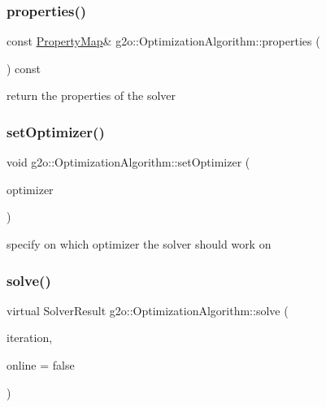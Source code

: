 \subsubsection{\texorpdfstring{properties()}{properties()}}
{\footnotesize\ttfamily const \mbox{\hyperlink{classg2o_1_1_property_map}{Property\+Map}}\& g2o\+::\+Optimization\+Algorithm\+::properties (\begin{DoxyParamCaption}{ }\end{DoxyParamCaption}) const\hspace{0.3cm}{\ttfamily [inline]}}



return the properties of the solver 

\mbox{\label{classg2o_1_1_optimization_algorithm_aff88a3dc8357c98712ff0047e601bd5e}} 
\subsubsection{\texorpdfstring{set\+Optimizer()}{setOptimizer()}}
{\footnotesize\ttfamily void g2o\+::\+Optimization\+Algorithm\+::set\+Optimizer (\begin{DoxyParamCaption}\item[{\mbox{\hyperlink{classg2o_1_1_sparse_optimizer}{Sparse\+Optimizer}} $\ast$}]{optimizer }\end{DoxyParamCaption})}

specify on which optimizer the solver should work on \mbox{\label{classg2o_1_1_optimization_algorithm_ab174deeeb2551ceaf715ea09f0f9c077}} 
\subsubsection{\texorpdfstring{solve()}{solve()}}
{\footnotesize\ttfamily virtual Solver\+Result g2o\+::\+Optimization\+Algorithm\+::solve (\begin{DoxyParamCaption}\item[{int}]{iteration,  }\item[{bool}]{online = {\ttfamily false} }\end{DoxyParamCaption})\hspace{0.3cm}{\ttfamily [pure virtual]}}

